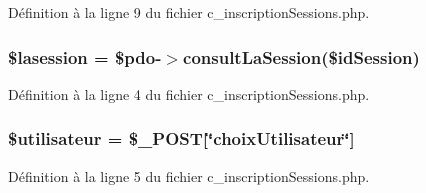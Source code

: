 Définition à la ligne 9 du fichier c\+\_\+inscription\+Sessions.\+php.

\subsubsection[{\texorpdfstring{\$lasession}{$lasession}}]{\setlength{\rightskip}{0pt plus 5cm}\$lasession = \$pdo-\/$>$consult\+La\+Session(\$id\+Session)}\hypertarget{c__inscription_sessions_8php_a380af04e3eb99fecc30ece89820d38c4}{}\label{c__inscription_sessions_8php_a380af04e3eb99fecc30ece89820d38c4}


Définition à la ligne 4 du fichier c\+\_\+inscription\+Sessions.\+php.

\subsubsection[{\texorpdfstring{\$utilisateur}{$utilisateur}}]{\setlength{\rightskip}{0pt plus 5cm}\$utilisateur = \$\+\_\+\+P\+O\+ST\mbox{[}\char`\"{}choix\+Utilisateur\char`\"{}\mbox{]}}\hypertarget{c__inscription_sessions_8php_a828de823fdd02f321434f4233e53793b}{}\label{c__inscription_sessions_8php_a828de823fdd02f321434f4233e53793b}


Définition à la ligne 5 du fichier c\+\_\+inscription\+Sessions.\+php.

